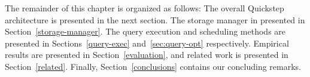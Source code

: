 The remainder of this chapter is organized as follows: The overall Quickstep architecture is presented in the next section. The storage manager in presented in Section~\ref{storage-manager}. The query execution and scheduling methods are presented in Sections~\ref{query-exec} and~\ref{sec:query-opt} respectively. Empirical results are presented in Section~\ref{evaluation}, and related work is presented in Section~\ref{related}. Finally, Section~\ref{conclusions} contains our concluding remarks.